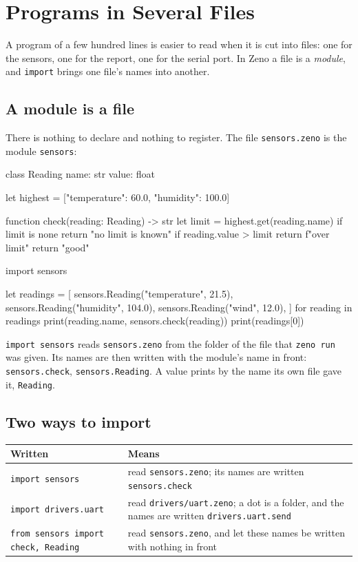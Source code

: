 \chapter{Programs in Several Files}\label{ch-modules}

A program of a few hundred lines is easier to read when it is cut into
files: one for the sensors, one for the report, one for the serial
port. In Zeno a file is a \emph{module}, and \verb|import| brings one
file's names into another.

\section{A module is a file}

There is nothing to declare and nothing to register. The file
\verb|sensors.zeno| is the module \verb|sensors|:

\begin{zeno}[file=sensors.zeno, dir=station, run=no]
class Reading {
    name: str
    value: float
}

let highest = ["temperature": 60.0, "humidity": 100.0]

function check(reading: Reading) -> str {
    let limit = highest.get(reading.name)
    if limit is none {
        return "no limit is known"
    }
    if reading.value > limit {
        return f"over {limit}"
    }
    return "good"
}
\end{zeno}

\begin{zeno}[file=main.zeno, dir=station]
import sensors

let readings = [
    sensors.Reading("temperature", 21.5),
    sensors.Reading("humidity", 104.0),
    sensors.Reading("wind", 12.0),
]
for reading in readings {
    print(reading.name, sensors.check(reading))
}
print(readings[0])
\end{zeno}

\verb|import sensors| reads \verb|sensors.zeno| from the folder of the
file that \verb|zeno run| was given. Its names are then written with
the module's name in front: \verb|sensors.check|,
\verb|sensors.Reading|. A value prints by the name its own file gave
it, \verb|Reading|.

\section{Two ways to import}

\begin{center}
\begin{tabular}{lP{8cm}}
\toprule
Written & Means \\
\midrule
\verb|import sensors| & read \verb|sensors.zeno|; its names are
  written \verb|sensors.check| \\
\verb|import drivers.uart| & read \verb|drivers/uart.zeno|; a dot is a
  folder, and the names are written \verb|drivers.uart.send| \\
\verb|from sensors import check, Reading| & read \verb|sensors.zeno|,
  and let these names be written with nothing in front \\
\bottomrule
\end{tabular}
\end{center}

